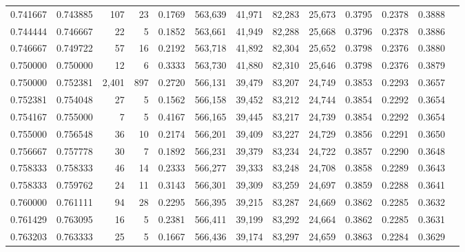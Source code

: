 \begin{tabular}{rrrrrrrrrrrrr}
0.741667 & 0.743885 &    107 &     23 &                                     0.1769 & 563,639 &  41,971 &  82,283 &  25,673 & 0.3795 & 0.2378 & 0.3888 \\
0.744444 & 0.746667 &     22 &      5 &                                     0.1852 & 563,661 &  41,949 &  82,288 &  25,668 & 0.3796 & 0.2378 & 0.3886 \\
0.746667 & 0.749722 &     57 &     16 &                                     0.2192 & 563,718 &  41,892 &  82,304 &  25,652 & 0.3798 & 0.2376 & 0.3880 \\
0.750000 & 0.750000 &     12 &      6 &                                     0.3333 & 563,730 &  41,880 &  82,310 &  25,646 & 0.3798 & 0.2376 & 0.3879 \\
0.750000 & 0.752381 &  2,401 &    897 &                                     0.2720 & 566,131 &  39,479 &  83,207 &  24,749 & 0.3853 & 0.2293 & 0.3657 \\
0.752381 & 0.754048 &     27 &      5 &                                     0.1562 & 566,158 &  39,452 &  83,212 &  24,744 & 0.3854 & 0.2292 & 0.3654 \\
0.754167 & 0.755000 &      7 &      5 &                                     0.4167 & 566,165 &  39,445 &  83,217 &  24,739 & 0.3854 & 0.2292 & 0.3654 \\
0.755000 & 0.756548 &     36 &     10 &                                     0.2174 & 566,201 &  39,409 &  83,227 &  24,729 & 0.3856 & 0.2291 & 0.3650 \\
0.756667 & 0.757778 &     30 &      7 &                                     0.1892 & 566,231 &  39,379 &  83,234 &  24,722 & 0.3857 & 0.2290 & 0.3648 \\
0.758333 & 0.758333 &     46 &     14 &                                     0.2333 & 566,277 &  39,333 &  83,248 &  24,708 & 0.3858 & 0.2289 & 0.3643 \\
0.758333 & 0.759762 &     24 &     11 &                                     0.3143 & 566,301 &  39,309 &  83,259 &  24,697 & 0.3859 & 0.2288 & 0.3641 \\
0.760000 & 0.761111 &     94 &     28 &                                     0.2295 & 566,395 &  39,215 &  83,287 &  24,669 & 0.3862 & 0.2285 & 0.3632 \\
0.761429 & 0.763095 &     16 &      5 &                                     0.2381 & 566,411 &  39,199 &  83,292 &  24,664 & 0.3862 & 0.2285 & 0.3631 \\
0.763203 & 0.763333 &     25 &      5 &                                     0.1667 & 566,436 &  39,174 &  83,297 &  24,659 & 0.3863 & 0.2284 & 0.3629 \\

\end{tabular}
